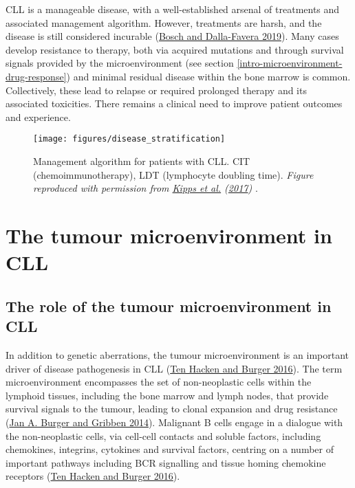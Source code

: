 \documentclass[11pt, a4paper, twosided]{book}
\begin{document}
CLL is a manageable disease, with a well-established arsenal of treatments and associated management algorithm. However, treatments are harsh, and the disease is still considered incurable (\protect\hyperlink{ref-Bosch2019}{Bosch and Dalla-Favera 2019}). Many cases develop resistance to therapy, both via acquired mutations and through survival signals provided by the microenvironment (see section \ref{intro-microenvironment-drug-response}) and minimal residual disease within the bone marrow is common. Collectively, these lead to relapse or required prolonged therapy and its associated toxicities. There remains a clinical need to improve patient outcomes and experience.


\begin{figure}

{\centering \texttt{[image: figures/disease\_stratification]} 

}

\caption{Management algorithm for patients with CLL. CIT (chemoimmunotherapy), LDT (lymphocyte doubling time). \emph{Figure reproduced with permission from \protect\hyperlink{ref-Kipps2017}{Kipps et al.} (\protect\hyperlink{ref-Kipps2017}{2017}) }.}\label{fig:CLLstratification}
\end{figure}
\hypertarget{intro-tumour-microenvironment}{%
\section{The tumour microenvironment in CLL}\label{intro-tumour-microenvironment}}

\hypertarget{intro-tumour-microenvironment-role}{%
\subsection{The role of the tumour microenvironment in CLL}\label{intro-tumour-microenvironment-role}}

In addition to genetic aberrations, the tumour microenvironment is an important driver of disease pathogenesis in CLL (\protect\hyperlink{ref-tenHacken2016}{Ten Hacken and Burger 2016}). The term microenvironment encompasses the set of non-neoplastic cells within the lymphoid tissues, including the bone marrow and lymph nodes, that provide survival signals to the tumour, leading to clonal expansion and drug resistance (\protect\hyperlink{ref-Burger2014}{Jan A. Burger and Gribben 2014}). Malignant B cells engage in a dialogue with the non-neoplastic cells, via cell-cell contacts and soluble factors, including chemokines, integrins, cytokines and survival factors, centring on a number of important pathways including BCR signalling and tissue homing chemokine receptors (\protect\hyperlink{ref-tenHacken2016}{Ten Hacken and Burger 2016}).
\end{document}
